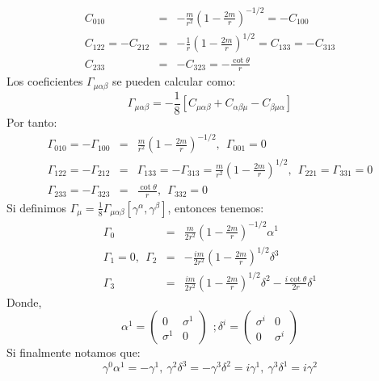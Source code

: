 \begin{eqnarray}
\nonumber C_{010}&=&-\frac{m}{r^{2}}\left(1-\frac{2m}{r}\right)^{-1/2}=-C_{100}\\
\nonumber C_{122}=-C_{212}&=&-\frac{1}{r}\left(1-\frac{2m}{r}\right)^{1/2}=C_{133}=-C_{313}\\
C_{233}&=&-C_{323}=-\frac{\cot\theta}{r}
\end{eqnarray}
Los coeficientes $\Gamma_{\mu\alpha\beta}$ se pueden calcular como:
\begin{equation}
\Gamma_{\mu\alpha\beta}=-\frac{1}{8}[C_{\mu\alpha\beta}+C_{\alpha\beta\mu}-C_{\beta\mu\alpha}]	
\end{equation}
Por tanto:
\begin{eqnarray}
\nonumber \Gamma_{010}=-\Gamma_{100}&=&\frac{m}{r^{2}}\left(1-\frac{2m}{r}\right)^{-1/2},\ \ \Gamma_{001}=0\\
\nonumber \Gamma_{122}=-\Gamma_{212}&=&\Gamma_{133}=-\Gamma_{313}=\frac{m}{r^{2}}\left(1-\frac{2m}{r}\right)^{1/2},\ \ \Gamma_{221}=\Gamma_{331}=0\\
\Gamma_{233}=-\Gamma_{323}&=&\frac{\cot\theta}{r},\ \ \Gamma_{332}=0
\end{eqnarray}
Si definimos $\Gamma_{\mu}=\frac{1}{8}\Gamma_{\mu\alpha\beta}[\gamma^\alpha,\gamma^\beta]$, entonces tenemos:
\begin{eqnarray}
\nonumber \Gamma_{0}&=&\frac{m}{2r^{2}}\left(1-\frac{2m}{r}\right)^{-1/2}\alpha^{1}\\
\nonumber \Gamma_{1}=0,\ \ \Gamma_{2}&=&-\frac{im}{2r^{2}}\left(1-\frac{2m}{r}\right)^{1/2}\delta^{3}\\
\Gamma_{3}&=&\frac{im}{2r^{2}}\left(1-\frac{2m}{r}\right)^{1/2}\delta^{2}-\frac{i\cot\theta}{2r}\delta^{1}
\end{eqnarray}
Donde,  
\begin{equation}
\alpha^{1}=\left(\begin{array}{cc}
0 & \sigma^{1}\\
\sigma^{1} & 0
\end{array}\right)\ \ ;\delta^{i}=\left(\begin{array}{cc}
\sigma^{i} & 0\\
0 & \sigma^{i}
\end{array}\right)
\end{equation}
Si finalmente notamos que:
\begin{equation}
\gamma^{0}\alpha^{1}=-\gamma^{1},\ \gamma^{2}\delta^{3}=-\gamma^{3}\delta^{2}=i\gamma^{1},\ \gamma^{3}\delta^{1}=i\gamma^{2}
\end{equation}	
